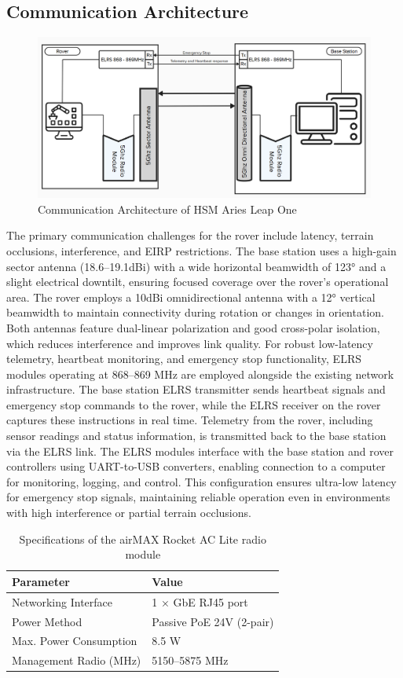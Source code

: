 \documentclass[letterpaper, 10 pt, conference]{ieeeconf}  %
\begin{document}
\subsection{Communication Architecture}
\begin{figure}[htbp]
    \centering
    \includegraphics[width=1\linewidth]{figures/Communication_setup.png}
    \caption{Communication Architecture of HSM Aries Leap One}
    \label{fig:placeholder}
\end{figure}
The primary communication challenges for the rover include latency, terrain occlusions, interference, and EIRP restrictions. The base station uses a high-gain sector antenna (18.6–19.1dBi) with a wide horizontal beamwidth of 123° and a slight electrical downtilt, ensuring focused coverage over the rover’s operational area. The rover employs a 10dBi omnidirectional antenna with a 12° vertical beamwidth to maintain connectivity during rotation or changes in orientation. Both antennas feature dual-linear polarization and good cross-polar isolation, which reduces interference and improves link quality. For robust low-latency telemetry, heartbeat monitoring, and emergency stop functionality, ELRS modules operating at 868–869 MHz are employed alongside the existing network infrastructure. The base station ELRS transmitter sends heartbeat signals and emergency stop commands to the rover, while the ELRS receiver on the rover captures these instructions in real time. Telemetry from the rover, including sensor readings and status information, is transmitted back to the base station via the ELRS link. The ELRS modules interface with the base station and rover controllers using UART-to-USB converters, enabling connection to a computer for monitoring, logging, and control. This configuration ensures ultra-low latency for emergency stop signals, maintaining reliable operation even in environments with high interference or partial terrain occlusions. 
\begin{table}[h!]
\centering
\caption{Specifications of the airMAX Rocket AC Lite radio module}
\begin{tabular}{|l|l|}
\hline
\textbf{Parameter} & \textbf{Value} \\ \hline
Networking Interface & 1 × GbE RJ45 port \\ \hline
Power Method & Passive PoE 24V (2-pair) \\ \hline
Max. Power Consumption & 8.5 W \\ \hline
Management Radio (MHz) & 5150–5875 MHz \\ \hline
\end{tabular}
\end{table}
\end{document}

